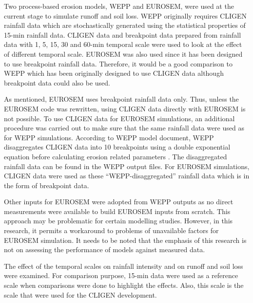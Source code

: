 Two process-based erosion models, WEPP and EUROSEM, were used at the current
stage to simulate runoff and soil loss. WEPP originally requires CLIGEN rainfall
data which are stochastically generated using the statistical properties of
15-min rainfall data. CLIGEN data and breakpoint data prepared from rainfall
data with 1, 5, 15, 30 and 60-min temporal scale were used to look at the effect
of different temporal scale. EUROSEM was also used since it has been
designed to use breakpoint rainfall data. Therefore, it would be a good
comparison to WEPP which has been originally designed to use CLIGEN data
although breakpoint data could also be used.

As mentioned, EUROSEM uses breakpoint rainfall data only. Thus, unless the
EUROSEM code was rewritten, using CLIGEN data directly with EUROSEM is not
possible. To use CLIGEN data for EUROSEM simulations, an additional
procedure was carried out to make sure that the same rainfall data were used
as for WEPP simulations. According to WEPP model document, WEPP disaggregates
CLIGEN data into 10 breakpoints using a double exponential equation before
calculating erosion related parameters \citep{flanagan1995-usda}. The
disaggregated rainfall data can be found in the WEPP output files. For EUROSEM
simulations, CLIGEN data were used as these ``WEPP-disaggregated'' rainfall
data which is in the form of breakpoint data.

Other inputs for EUROSEM were adopted from WEPP outputs as no direct
measurements were available to build EUROSEM inputs from scratch. This approach
may be problematic for certain modelling studies. However, in this research, it
permits a workaround to problems of unavailable factors for EUROSEM simulation.
It needs to be noted that the emphasis of this research is not on assessing the
performance of models against measured data.

The effect of the temporal scales on rainfall intensity and on runoff and soil
loss were examined. For comparison purpose, 15-min data were used as a reference
scale when comparisons were done to highlight the effects. Also, this scale is
the scale that were used for the CLIGEN development.


